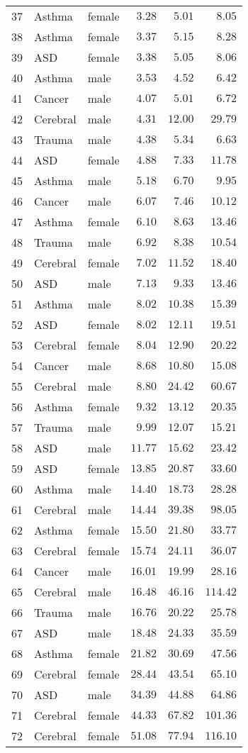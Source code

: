 \begin{table}[!tbp]
\begin{center}
\begin{tabular}{lllrrr}
37&Asthma&female&$   3.28$&$   5.01$&$  8.05$\tabularnewline
38&Asthma&female&$   3.37$&$   5.15$&$  8.28$\tabularnewline
39&ASD&female&$   3.38$&$   5.05$&$  8.06$\tabularnewline
40&Asthma&male&$   3.53$&$   4.52$&$  6.42$\tabularnewline
41&Cancer&male&$   4.07$&$   5.01$&$  6.72$\tabularnewline
42&Cerebral&male&$   4.31$&$  12.00$&$ 29.79$\tabularnewline
43&Trauma&male&$   4.38$&$   5.34$&$  6.63$\tabularnewline
44&ASD&female&$   4.88$&$   7.33$&$ 11.78$\tabularnewline
45&Asthma&male&$   5.18$&$   6.70$&$  9.95$\tabularnewline
46&Cancer&male&$   6.07$&$   7.46$&$ 10.12$\tabularnewline
47&Asthma&female&$   6.10$&$   8.63$&$ 13.46$\tabularnewline
48&Trauma&male&$   6.92$&$   8.38$&$ 10.54$\tabularnewline
49&Cerebral&female&$   7.02$&$  11.52$&$ 18.40$\tabularnewline
50&ASD&male&$   7.13$&$   9.33$&$ 13.46$\tabularnewline
51&Asthma&male&$   8.02$&$  10.38$&$ 15.39$\tabularnewline
52&ASD&female&$   8.02$&$  12.11$&$ 19.51$\tabularnewline
53&Cerebral&female&$   8.04$&$  12.90$&$ 20.22$\tabularnewline
54&Cancer&male&$   8.68$&$  10.80$&$ 15.08$\tabularnewline
55&Cerebral&male&$   8.80$&$  24.42$&$ 60.67$\tabularnewline
56&Asthma&female&$   9.32$&$  13.12$&$ 20.35$\tabularnewline
57&Trauma&male&$   9.99$&$  12.07$&$ 15.21$\tabularnewline
58&ASD&male&$  11.77$&$  15.62$&$ 23.42$\tabularnewline
59&ASD&female&$  13.85$&$  20.87$&$ 33.60$\tabularnewline
60&Asthma&male&$  14.40$&$  18.73$&$ 28.28$\tabularnewline
61&Cerebral&male&$  14.44$&$  39.38$&$ 98.05$\tabularnewline
62&Asthma&female&$  15.50$&$  21.80$&$ 33.77$\tabularnewline
63&Cerebral&female&$  15.74$&$  24.11$&$ 36.07$\tabularnewline
64&Cancer&male&$  16.01$&$  19.99$&$ 28.16$\tabularnewline
65&Cerebral&male&$  16.48$&$  46.16$&$114.42$\tabularnewline
66&Trauma&male&$  16.76$&$  20.22$&$ 25.78$\tabularnewline
67&ASD&male&$  18.48$&$  24.33$&$ 35.59$\tabularnewline
68&Asthma&female&$  21.82$&$  30.69$&$ 47.56$\tabularnewline
69&Cerebral&female&$  28.44$&$  43.54$&$ 65.10$\tabularnewline
70&ASD&male&$  34.39$&$  44.88$&$ 64.86$\tabularnewline
71&Cerebral&female&$  44.33$&$  67.82$&$101.36$\tabularnewline
72&Cerebral&female&$  51.08$&$  77.94$&$116.10$\tabularnewline
\hline
\end{tabular}\end{center}
\end{table}

